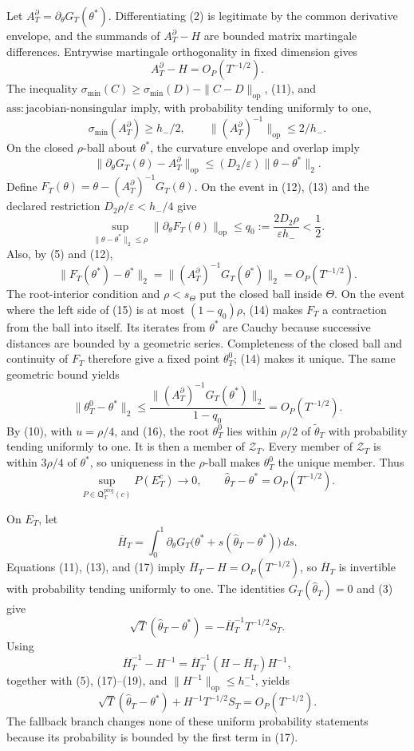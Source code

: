 Let \(A_T^{\partial}=\partial_\theta G_T(\theta^*)\). Differentiating (2) is legitimate by the common derivative envelope, and the summands of \(A_T^{\partial}-H\) are bounded matrix martingale differences. Entrywise martingale orthogonality in fixed dimension gives
\[
 A_T^{\partial}-H=O_P(T^{-1/2}).
\tag{11}
\]
The inequality \(\sigma_{\min}(C)\ge\sigma_{\min}(D)-\|C-D\|_{\mathrm{op}}\), (11), and \(\mathrm{ass:jacobian\text{-}nonsingular}\) imply, with probability tending uniformly to one,
\[
 \sigma_{\min}(A_T^{\partial})\ge h_-/2,
 \qquad \|(A_T^{\partial})^{-1}\|_{\mathrm{op}}\le2/h_-.
\tag{12}
\]
On the closed \(\rho\)-ball about \(\theta^*\), the curvature envelope and overlap imply
\[
 \|\partial_\theta G_T(\theta)-A_T^{\partial}\|_{\mathrm{op}}
 \le(D_2/\varepsilon)\|\theta-\theta^*\|_2.
\tag{13}
\]
Define \(F_T(\theta)=\theta-(A_T^{\partial})^{-1}G_T(\theta)\). On the event in (12), (13) and the declared restriction \(D_2\rho/\varepsilon<h_-/4\) give
\[
 \sup_{\|\theta-\theta^*\|_2\le\rho}
 \|\partial_\theta F_T(\theta)\|_{\mathrm{op}}
 \le q_0:=\frac{2D_2\rho}{\varepsilon h_-}<\frac12.
\tag{14}
\]
Also, by (5) and (12),
\[
 \|F_T(\theta^*)-\theta^*\|_2
 =\|(A_T^{\partial})^{-1}G_T(\theta^*)\|_2=O_P(T^{-1/2}).
\tag{15}
\]
The root-interior condition and \(\rho<s_\Theta\) put the closed ball inside \(\Theta\). On the event where the left side of (15) is at most \((1-q_0)\rho\), (14) makes \(F_T\) a contraction from the ball into itself. Its iterates from \(\theta^*\) are Cauchy because successive distances are bounded by a geometric series. Completeness of the closed ball and continuity of \(F_T\) therefore give a fixed point \(\theta_T^0\); (14) makes it unique. The same geometric bound yields
\[
 \|\theta_T^0-\theta^*\|_2
 \le\frac{\|(A_T^{\partial})^{-1}G_T(\theta^*)\|_2}{1-q_0}
 =O_P(T^{-1/2}).
\tag{16}
\]
By (10), with \(u=\rho/4\), and (16), the root \(\theta_T^0\) lies within \(\rho/2\) of \(\widetilde\theta_T\) with probability tending uniformly to one. It is then a member of \(\mathcal Z_T\). Every member of \(\mathcal Z_T\) is within \(3\rho/4\) of \(\theta^*\), so uniqueness in the \(\rho\)-ball makes \(\theta_T^0\) the unique member. Thus
\[
 \sup_{P\in\mathfrak Q_T^{\mathrm{proj}}(c)}P(E_T^c)\longrightarrow0,
 \qquad \widehat\theta_T-\theta^*=O_P(T^{-1/2}).
\tag{17}
\]

On \(E_T\), let
\[
 \overline H_T=\int_0^1\partial_\theta G_T
 \bigl(\theta^*+s(\widehat\theta_T-\theta^*)\bigr)\,ds.
\tag{18}
\]
Equations (11), (13), and (17) imply \(\overline H_T-H=O_P(T^{-1/2})\), so \(\overline H_T\) is invertible with probability tending uniformly to one. The identities \(G_T(\widehat\theta_T)=0\) and (3) give
\[
 \sqrt T(\widehat\theta_T-\theta^*)
 =-\overline H_T^{-1}T^{-1/2}S_T.
\tag{19}
\]
Using
\[
 \overline H_T^{-1}-H^{-1}
 =\overline H_T^{-1}(H-\overline H_T)H^{-1},
\tag{20}
\]
together with (5), (17)--(19), and \(\|H^{-1}\|_{\mathrm{op}}\le h_-^{-1}\), yields
\[
 \sqrt T(\widehat\theta_T-\theta^*)+H^{-1}T^{-1/2}S_T
 =O_P(T^{-1/2}).
\tag{21}
\]
The fallback branch changes none of these uniform probability statements because its probability is bounded by the first term in (17).

